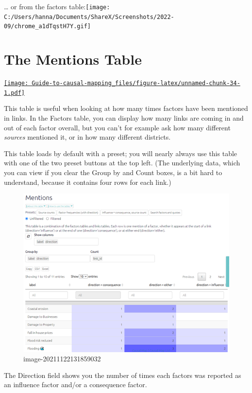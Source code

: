 \documentclass[
]{book}
\begin{document}
\ldots{} or from the factors table:\texttt{[image: C:/Users/hanna/Documents/ShareX/Screenshots/2022-09/chrome\_a1dTqstH7Y.gif]}

\hypertarget{xthe-mentions-table-old}{%
\chapter{The Mentions Table}\label{xthe-mentions-table-old}}

\href{https://player.vimeo.com/video/596594094}{\texttt{[image: Guide-to-causal-mapping\_files/figure-latex/unnamed-chunk-34-1.pdf]}}

This table is useful when looking at how many times factors have been mentioned in links. In the Factors table, you can display how many links are coming in and out of each factor overall, but you can't for example ask how many different \emph{sources} mentioned it, or in how many different districts.

This table loads by default with a preset; you will nearly always use this table with one of the two preset buttons at the top left. (The underlying data, which you can view if you clear the Group by and Count boxes, is a bit hard to understand, because it contains four rows for each link.)

\begin{figure}
\centering
\includegraphics[width=6.77083in,height=\textheight]{_assets/image-20211122131859032.png}
\caption{image-20211122131859032}
\end{figure}

The Direction field shows you the number of times each factors was reported as an influence factor and/or a consequence factor.
\end{document}
